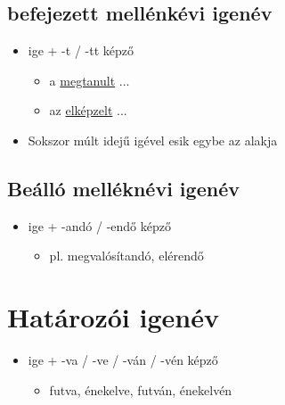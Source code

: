 \documentclass{article}
\begin{document}
\subsection{befejezett mellénkévi igenév}
\begin{itemize}
    \item ige + -t / -tt képző
    \begin{itemize}
        \item a \underline{megtanult} ...
        \item az \underline{elképzelt} ...
    \end{itemize}
    \item Sokszor múlt idejű igével esik egybe az alakja
\end{itemize}
\subsection{Beálló melléknévi igenév}
\begin{itemize}
    \item ige + -andó / -endő képző
    \begin{itemize}
        \item pl. megvalósítandó, elérendő
    \end{itemize}
\end{itemize}

\section{Határozói igenév}
\begin{itemize}
    \item ige + -va / -ve / -ván / -vén képző
    \begin{itemize}
        \item futva, énekelve, futván, énekelvén
    \end{itemize}
\end{itemize}
\end{document}
